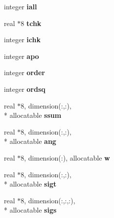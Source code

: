 \begin{DoxyCompactItemize}
\item 
\hypertarget{classinvar_ac94f06afb54503fdcfb76aa3271f150f}{integer {\bfseries iall}}\label{classinvar_ac94f06afb54503fdcfb76aa3271f150f}

\item 
\hypertarget{classinvar_ae05f644150f4a61fb93c066519e16253}{real $\ast$8 {\bfseries tchk}}\label{classinvar_ae05f644150f4a61fb93c066519e16253}

\item 
\hypertarget{classinvar_ab341cd3ab4c4d39818e4a67f24b4f8db}{integer {\bfseries ichk}}\label{classinvar_ab341cd3ab4c4d39818e4a67f24b4f8db}

\item 
\hypertarget{classinvar_ad343382de87380b003d3cb1956f9d7f6}{integer {\bfseries apo}}\label{classinvar_ad343382de87380b003d3cb1956f9d7f6}

\item 
\hypertarget{classinvar_a61de2c440600d5d2ac76813668f8e822}{integer {\bfseries order}}\label{classinvar_a61de2c440600d5d2ac76813668f8e822}

\item 
\hypertarget{classinvar_a094a6bb02520f1985afcbd316bddfc9a}{integer {\bfseries ordsq}}\label{classinvar_a094a6bb02520f1985afcbd316bddfc9a}

\item 
\hypertarget{classinvar_aa99f29b7ae37d212b885d6a632d36baa}{real $\ast$8, dimension(\-:,\-:), \\*
allocatable {\bfseries ssum}}\label{classinvar_aa99f29b7ae37d212b885d6a632d36baa}

\item 
\hypertarget{classinvar_a42fc94342b9f9064432aca52d36a99e9}{real $\ast$8, dimension(\-:,\-:), \\*
allocatable {\bfseries ang}}\label{classinvar_a42fc94342b9f9064432aca52d36a99e9}

\item 
\hypertarget{classinvar_a3fe98ed23b01e69ed2a26e168daf3f86}{real $\ast$8, dimension(\-:), allocatable {\bfseries w}}\label{classinvar_a3fe98ed23b01e69ed2a26e168daf3f86}

\item 
\hypertarget{classinvar_a4a9f22ce179e94bf9c3fe258faae5b58}{real $\ast$8, dimension(\-:,\-:), \\*
allocatable {\bfseries sigt}}\label{classinvar_a4a9f22ce179e94bf9c3fe258faae5b58}

\item 
\hypertarget{classinvar_a9955ce132cdd8e0c1057c56696cdabbb}{real $\ast$8, dimension(\-:,\-:,\-:), \\*
allocatable {\bfseries sigs}}\label{classinvar_a9955ce132cdd8e0c1057c56696cdabbb}


\end{DoxyCompactItemize}
